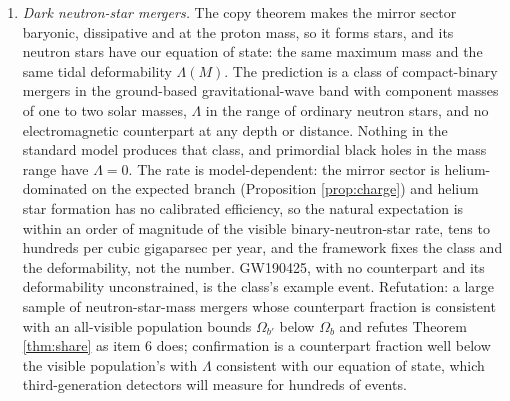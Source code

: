 \documentclass[11pt]{article}
\theoremstyle{definition}
\begin{document}
\begin{enumerate}
mass-to-light ratio. The test therefore needs two analyses not yet made: a vertical-dynamics or phase-space-spiral analysis of Gaia data with a dark disk of that thickness, and a bulge model with a disk-like dark component. Until then the Galaxy test is registered, not run.
\item \emph{Dark neutron-star mergers.} The copy theorem makes the mirror sector baryonic, dissipative and at the proton mass, so it forms stars, and its neutron stars have our equation of state: the same maximum mass and the same tidal deformability $\Lambda(M)$. The prediction is a class of compact-binary mergers in the ground-based gravitational-wave band with component masses of one to two solar masses, $\Lambda$ in the range of ordinary neutron stars, and no electromagnetic counterpart at any depth or distance. Nothing in the standard model produces that class, and primordial black holes in the mass range have $\Lambda = 0$. The rate is model-dependent: the mirror sector is helium-dominated on the expected branch (Proposition \ref{prop:charge}) and helium star formation has no calibrated efficiency, so the natural expectation is within an order of magnitude of the visible binary-neutron-star rate, tens to hundreds per cubic gigaparsec per year, and the framework fixes the class and the deformability, not the number. GW190425, with no counterpart and its deformability unconstrained, is the class's example event. Refutation: a large sample of neutron-star-mass mergers whose counterpart fraction is consistent with an all-visible population bounds $\Omega_{b'}$ below $\Omega_{b}$ and refutes Theorem \ref{thm:share} as item 6 does; confirmation is a counterpart fraction well below the visible population's with $\Lambda$ consistent with our equation of state, which third-generation detectors will measure for hundreds of events.
\end{enumerate}
\end{document}
